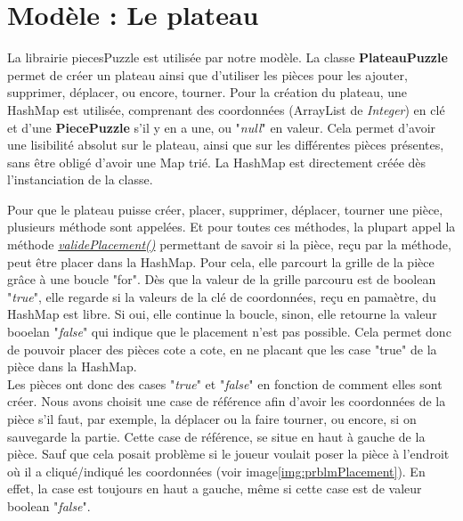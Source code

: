     \section{Modèle : Le plateau}

        La librairie piecesPuzzle est utilisée par notre modèle. La classe \textbf{PlateauPuzzle} permet de créer un plateau ainsi que d'utiliser les pièces pour les ajouter, supprimer, déplacer, ou encore, tourner.
        Pour la création du plateau, une HashMap est utilisée, comprenant des coordonnées (ArrayList de \textit{Integer}) en clé et d'une \textbf{PiecePuzzle} s'il y en a une, ou "\textit{null}" en valeur. Cela permet d'avoir une lisibilité absolut sur le plateau, ainsi que sur les différentes pièces présentes, sans être obligé d'avoir une Map trié. La HashMap est directement créée dès l'instanciation de la classe.

        Pour que le plateau puisse créer, placer, supprimer, déplacer, tourner une pièce, plusieurs méthode sont appelées. Et pour toutes ces méthodes, la plupart appel la méthode \underline{\textit{validePlacement()}\label{txt:validePlacement}} permettant de savoir si la pièce, reçu par la méthode, peut être placer dans la HashMap. Pour cela, elle parcourt la grille de la pièce grâce à une boucle "for". Dès que la valeur de la grille parcouru est de boolean "\textit{true}", elle regarde si la valeurs de la clé de coordonnées, reçu en pamaètre, du HashMap est libre. Si oui, elle continue la boucle, sinon, elle retourne la valeur booelan "\textit{false}" qui indique que le placement n'est pas possible. Cela permet donc de pouvoir placer des pièces cote a cote, en ne placant que les case "true" de la pièce dans la HashMap.\\

        Les pièces ont donc des cases "\textit{true}" et "\textit{false}" en fonction de comment elles sont créer. Nous avons choisit une case de référence afin d'avoir les coordonnées de la pièce s'il faut, par exemple, la déplacer ou la faire tourner, ou encore, si on sauvegarde la partie. Cette case de référence, se situe en haut à gauche de la pièce.
        Sauf que cela posait problème si le joueur voulait poser la pièce à l'endroit où il a cliqué/indiqué les coordonnées (voir image\ref{img:prblmPlacement}). En effet, la case est toujours en haut a gauche, même si cette case est de valeur boolean "\textit{false}".\\

